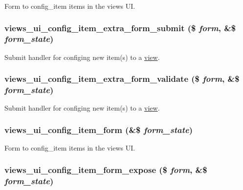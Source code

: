 Form to config\_\-item items in the views UI. \hypertarget{admin_8inc_d5e1d436875b612146deb11b52a3b98e}{
\subsubsection[{views\_\-ui\_\-config\_\-item\_\-extra\_\-form\_\-submit}]{\setlength{\rightskip}{0pt plus 5cm}views\_\-ui\_\-config\_\-item\_\-extra\_\-form\_\-submit (\$ {\em form}, \/  \&\$ {\em form\_\-state})}}
\label{admin_8inc_d5e1d436875b612146deb11b52a3b98e}


Submit handler for configing new item(s) to a \hyperlink{classview}{view}. \hypertarget{admin_8inc_70cfe0eb4a09c66d85dc24fd55a57b30}{
\subsubsection[{views\_\-ui\_\-config\_\-item\_\-extra\_\-form\_\-validate}]{\setlength{\rightskip}{0pt plus 5cm}views\_\-ui\_\-config\_\-item\_\-extra\_\-form\_\-validate (\$ {\em form}, \/  \&\$ {\em form\_\-state})}}
\label{admin_8inc_70cfe0eb4a09c66d85dc24fd55a57b30}


Submit handler for configing new item(s) to a \hyperlink{classview}{view}. \hypertarget{admin_8inc_881698f18e68deadddd14f239f351922}{
\subsubsection[{views\_\-ui\_\-config\_\-item\_\-form}]{\setlength{\rightskip}{0pt plus 5cm}views\_\-ui\_\-config\_\-item\_\-form (\&\$ {\em form\_\-state})}}
\label{admin_8inc_881698f18e68deadddd14f239f351922}


Form to config\_\-item items in the views UI. \hypertarget{admin_8inc_3a3a7734f5b034e63b7866c326c70229}{
\subsubsection[{views\_\-ui\_\-config\_\-item\_\-form\_\-expose}]{\setlength{\rightskip}{0pt plus 5cm}views\_\-ui\_\-config\_\-item\_\-form\_\-expose (\$ {\em form}, \/  \&\$ {\em form\_\-state})}}
\label{admin_8inc_3a3a7734f5b034e63b7866c326c70229}


